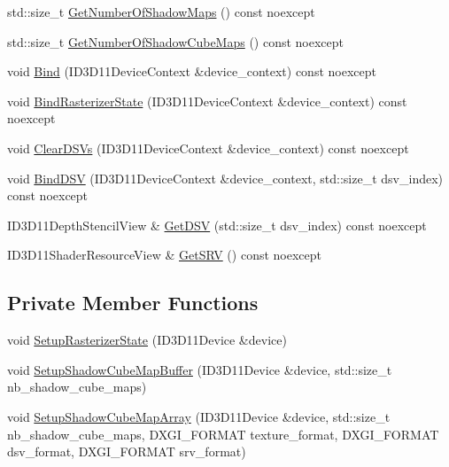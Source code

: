 \begin{DoxyCompactItemize}
\item 
std\+::size\+\_\+t \mbox{\hyperlink{classmage_1_1rendering_1_1_shadow_cube_map_buffer_a6cdc73b4553c0b9ae5c4679ff00695c0}{Get\+Number\+Of\+Shadow\+Maps}} () const noexcept
\item 
std\+::size\+\_\+t \mbox{\hyperlink{classmage_1_1rendering_1_1_shadow_cube_map_buffer_af6e512b7818e40ca4c38d2296727d001}{Get\+Number\+Of\+Shadow\+Cube\+Maps}} () const noexcept
\item 
void \mbox{\hyperlink{classmage_1_1rendering_1_1_shadow_cube_map_buffer_a584f753f82c2378a8c7171bdf5a96999}{Bind}} (I\+D3\+D11\+Device\+Context \&device\+\_\+context) const noexcept
\item 
void \mbox{\hyperlink{classmage_1_1rendering_1_1_shadow_cube_map_buffer_aa206227920ac298eb4dcfdc8e662663d}{Bind\+Rasterizer\+State}} (I\+D3\+D11\+Device\+Context \&device\+\_\+context) const noexcept
\item 
void \mbox{\hyperlink{classmage_1_1rendering_1_1_shadow_cube_map_buffer_a31df46f6fe89cbaedb7f256ab7ecf514}{Clear\+D\+S\+Vs}} (I\+D3\+D11\+Device\+Context \&device\+\_\+context) const noexcept
\item 
void \mbox{\hyperlink{classmage_1_1rendering_1_1_shadow_cube_map_buffer_a3e9f7fe55c69250fef6b23350556471c}{Bind\+D\+SV}} (I\+D3\+D11\+Device\+Context \&device\+\_\+context, std\+::size\+\_\+t dsv\+\_\+index) const noexcept
\item 
I\+D3\+D11\+Depth\+Stencil\+View \& \mbox{\hyperlink{classmage_1_1rendering_1_1_shadow_cube_map_buffer_a81dcaec976e595dc705bdb3fd7b91124}{Get\+D\+SV}} (std\+::size\+\_\+t dsv\+\_\+index) const noexcept
\item 
I\+D3\+D11\+Shader\+Resource\+View \& \mbox{\hyperlink{classmage_1_1rendering_1_1_shadow_cube_map_buffer_af373185fc99b3c2f736e9a397436951a}{Get\+S\+RV}} () const noexcept
\end{DoxyCompactItemize}
\subsection*{Private Member Functions}
\begin{DoxyCompactItemize}
\item 
void \mbox{\hyperlink{classmage_1_1rendering_1_1_shadow_cube_map_buffer_a65d31b9a335e6c27c8d4d6e0127029b2}{Setup\+Rasterizer\+State}} (I\+D3\+D11\+Device \&device)
\item 
void \mbox{\hyperlink{classmage_1_1rendering_1_1_shadow_cube_map_buffer_a1c978f179d9af2750dcc13cabf29d3cd}{Setup\+Shadow\+Cube\+Map\+Buffer}} (I\+D3\+D11\+Device \&device, std\+::size\+\_\+t nb\+\_\+shadow\+\_\+cube\+\_\+maps)
\item 
void \mbox{\hyperlink{classmage_1_1rendering_1_1_shadow_cube_map_buffer_abaf4316e237cfa973506155c31c3ffc9}{Setup\+Shadow\+Cube\+Map\+Array}} (I\+D3\+D11\+Device \&device, std\+::size\+\_\+t nb\+\_\+shadow\+\_\+cube\+\_\+maps, D\+X\+G\+I\+\_\+\+F\+O\+R\+M\+AT texture\+\_\+format, D\+X\+G\+I\+\_\+\+F\+O\+R\+M\+AT dsv\+\_\+format, D\+X\+G\+I\+\_\+\+F\+O\+R\+M\+AT srv\+\_\+format)
\end{DoxyCompactItemize}
